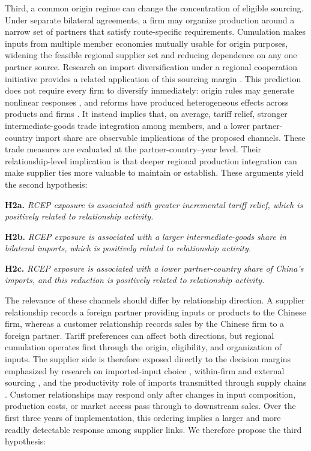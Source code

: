 \documentclass[preprint,12pt,authoryear]{elsarticle}
\begin{document}
Third, a common origin regime can change the concentration of eligible sourcing. Under separate bilateral agreements, a firm may organize production around a narrow set of partners that satisfy route-specific requirements. Cumulation makes inputs from multiple member economies mutually usable for origin purposes, widening the feasible regional supplier set and reducing dependence on any one partner source. Research on import diversification under a regional cooperation initiative provides a related application of this sourcing margin \citep{zhu2025diversifying}. This prediction does not require every firm to diversify immediately: origin rules may generate nonlinear responses \citep{head2024laffer}, and reforms have produced heterogeneous effects across products and firms \citep{tanaka2022rooexports,hayakawa2023reform}. It instead implies that, on average, tariff relief, stronger intermediate-goods trade integration among members, and a lower partner-country import share are observable implications of the proposed channels. These trade measures are evaluated at the partner-country--year level. Their relationship-level implication is that deeper regional production integration can make supplier ties more valuable to maintain or establish. These arguments yield the second hypothesis:

\noindent\textbf{H2a.} \textit{RCEP exposure is associated with greater incremental tariff relief, which is positively related to relationship activity.}

\noindent\textbf{H2b.} \textit{RCEP exposure is associated with a larger intermediate-goods share in bilateral imports, which is positively related to relationship activity.}

\noindent\textbf{H2c.} \textit{RCEP exposure is associated with a lower partner-country share of China's imports, and this reduction is positively related to relationship activity.}

The relevance of these channels should differ by relationship direction. A supplier relationship records a foreign partner providing inputs or products to the Chinese firm, whereas a customer relationship records sales by the Chinese firm to a foreign partner. Tariff preferences can affect both directions, but regional cumulation operates first through the origin, eligibility, and organization of inputs. The supplier side is therefore exposed directly to the decision margins emphasized by research on imported-input choice \citep{handley2024input}, within-firm and external sourcing \citep{garg2023within}, and the productivity role of imports transmitted through supply chains \citep{newman2023imports}. Customer relationships may respond only after changes in input composition, production costs, or market access pass through to downstream sales. Over the first three years of implementation, this ordering implies a larger and more readily detectable response among supplier links. We therefore propose the third hypothesis:
\end{document}
